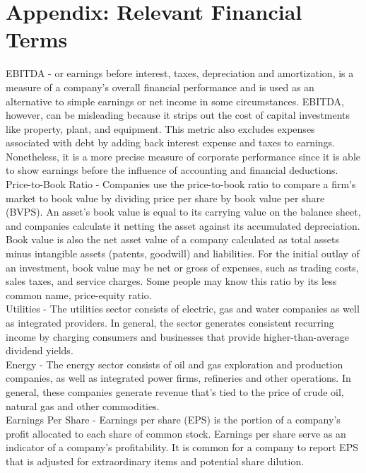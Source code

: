 \documentclass[12pt]{article}
\begin{document}
	\section*{Appendix:  Relevant Financial Terms}
		\vspace{-1.5ex}
	EBITDA - or earnings before interest, taxes, depreciation and amortization, is a measure of a company's overall financial performance and is used as an alternative to simple earnings or net income in some circumstances. EBITDA, however, can be misleading because it strips out the cost of capital investments like property, plant, and equipment. This metric also excludes expenses associated with debt by adding back interest expense and taxes to earnings. Nonetheless, it is a more precise measure of corporate performance since it is able to show earnings before the influence of accounting and financial deductions.\cite{etfDB}\\
	Price-to-Book Ratio - Companies use the price-to-book ratio to compare a firm's market to book value by dividing price per share by book value per share (BVPS). An asset's book value is equal to its carrying value on the balance sheet, and companies calculate it netting the asset against its accumulated depreciation. Book value is also the net asset value of a company calculated as total assets minus intangible assets (patents, goodwill) and liabilities. For the initial outlay of an investment, book value may be net or gross of expenses, such as trading costs, sales taxes, and service charges. Some people may know this ratio by its less common name, price-equity ratio.\cite{etfDB}\\
	Utilities - The utilities sector consists of electric, gas and water companies as well as integrated providers. In general, the sector generates consistent recurring income by charging consumers and businesses that provide higher-than-average dividend yields.\cite{investopedia}\\
	Energy - The energy sector consists of oil and gas exploration and production companies, as well as integrated power firms, refineries and other operations. In general, these companies generate revenue that’s tied to the price of crude oil, natural gas and other commodities.\cite{investopedia}\\
	Earnings Per Share - Earnings per share (EPS) is the portion of a company's profit allocated to each share of common stock. Earnings per share serve as an indicator of a company's profitability. It is common for a company to report EPS that is adjusted for extraordinary items and potential share dilution. \cite{investopedia}\\
\end{document}
